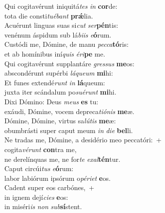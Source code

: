\evenverse Qui cogitavérunt iniquitá\textit{tes} \textit{in} \textbf{cor}de:~\*\\
\evenverse tota die consti\textit{tu}\textit{é}\textit{bant} \textbf{prǽ}lia.\\
\oddverse Acuérunt linguas suas si\textit{cut} \textit{ser}\textbf{pén}tis:~\*\\
\oddverse venénum áspidum sub lá\textit{bi}\textit{is} \textit{e}\textbf{ó}rum.\\
\evenverse Custódi me, Dómine, de manu \textit{pec}\textit{ca}\textbf{tó}ris:~\*\\
\evenverse et ab homínibus iní\textit{quis} \textit{é}\textit{ri}\textbf{pe} me.\\
\oddverse Qui cogitavérunt supplantáre \textit{gres}\textit{sus} \textbf{me}os:~\*\\
\oddverse abscondérunt supérbi \textit{lá}\textit{que}\textit{um} \textbf{mi}hi:\\
\evenverse Et funes extendé\textit{runt} \textit{in} \textbf{lá}queum:~\*\\
\evenverse juxta iter scándalum po\textit{su}\textit{é}\textit{runt} \textbf{mi}hi.\\
\oddverse Dixi Dómino: Deus \textit{me}\textit{us} \textbf{es} tu:~\*\\
\oddverse exáudi, Dómine, vocem depreca\textit{ti}\textit{ó}\textit{nis} \textbf{me}æ.\\
\evenverse Dómine, Dómine, virtus sa\textit{lú}\textit{tis} \textbf{me}æ:~\*\\
\evenverse obumbrásti super caput meum \textit{in} \textit{di}\textit{e} \textbf{bel}li.\\
\oddverse Ne tradas me, Dómine, a desidério meo peccatóri:~+\\
\oddverse  cogita\textit{vé}\textit{runt} \textbf{con}tra me,~\*\\
\oddverse ne derelínquas me, ne for\textit{te} \textit{e}\textit{xal}\textbf{tén}tur.\\
\evenverse Caput circúi\textit{tus} \textit{e}\textbf{ó}rum:~\*\\
\evenverse labor labiórum ipsórum o\textit{pé}\textit{ri}\textit{et} \textbf{e}os.\\
\oddverse Cadent super eos carbónes,~+\\
\oddverse  in ignem dejí\textit{ci}\textit{es} \textbf{e}os:~\*\\
\oddverse in miséri\textit{is} \textit{non} \textit{sub}\textbf{sí}stent.\\
